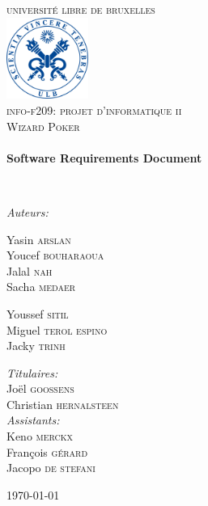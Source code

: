 \begin{titlepage}
\begin{center}

\textsc{\LARGE universit\'e libre de bruxelles}\\[1.5cm]

\includegraphics[width=0.2\textwidth]{Images/ulblogo.jpg}~\\[1cm]

\textsc{\Large info-f209: projet d'informatique ii\\[0.3cm] Wizard Poker}\\[0.5cm]

\HRule \\[0.4cm]
{ \huge \bfseries Software Requirements Document  \\[0.4cm] }

\HRule \\[1.5cm]

\noindent
\begin{center} \large
\emph{Auteurs:}\\
\end{center}
\begin{minipage}{0.4\textwidth}
\begin{flushleft} \large
Yasin \textsc{arslan}\\
Youcef \textsc{bouharaoua}\\
Jalal \textsc{nah}\\
Sacha \textsc{medaer}
\end{flushleft}
\end{minipage}
\begin{minipage}{0.4\textwidth}
\begin{flushright} \large
Youssef \textsc{sitil}\\
Miguel \textsc{terol espino}\\
Jacky \textsc{trinh}
\end{flushright}
\end{minipage}
\linebreak
\linebreak
\begin{center} \large
\emph{Titulaires:} \\
Joël \textsc{goossens}\\
Christian \textsc{hernalsteen}\\
\emph{Assistants:} \\
Keno \textsc{merckx}\\
François \textsc{gérard}\\
Jacopo \textsc{de stefani}\\
\end{center}

\vfill

{\large \today}

\end{center}
\end{titlepage}